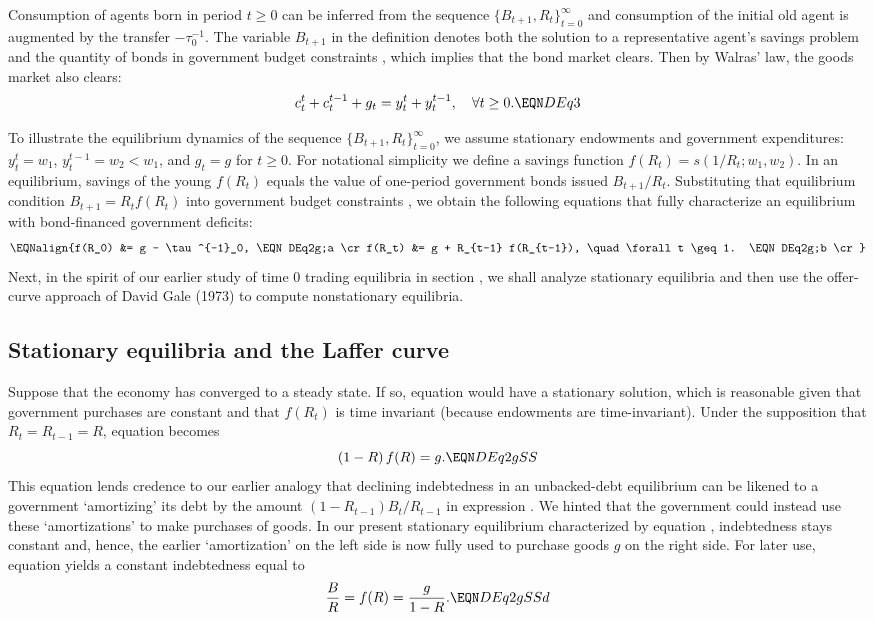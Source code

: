 \noindent
Consumption of agents born in period $t\geq 0$ can be
inferred from the sequence $\{B_{t+1}, R_t\}_{t=0}^\infty$ 
and consumption of the initial old agent is augmented by the
transfer $-\tau^{-1}_0$. The variable $B_{t+1}$ in the definition
denotes both the solution to a representative agent's savings 
problem  and the quantity of bonds in government 
budget constraints , which implies that the 
bond market clears. Then by Walras' law, the goods market also 
clears:
$$c_t^t + c_t^{t-1} + g_t = y_t^t + y_t^{t-1}, 
\quad \forall t \geq 0.        \EQN DEq3
$$


To illustrate the equilibrium dynamics of the sequence
$\{B_{t+1}, R_t\}_{t=0}^\infty$, we assume stationary
endowments and government expenditures: $y^t_t = w_1$,
$y^{t-1}_t=w_2<w_1$, and $g_t=g$ for $t\geq 0$. 
For notational simplicity we define a savings function
$f(R_t)= s(1/R_t; w_1, w_2)$. In an equilibrium, 
savings of the young $f(R_t)$ 
equals the value of one-period government bonds issued
$B_{t+1}/R_t$. Substituting that equilibrium condition
$B_{t+1}=R_t f(R_t)$ into government budget constraints
, we obtain the following equations that
fully characterize an equilibrium with bond-financed 
government deficits:
$$\EQNalign{f(R_0) &= g - \tau^{-1}_0,   \EQN DEq2g;a  \cr
            f(R_t) &= g + R_{t-1} f(R_{t-1}),  \quad \forall t \geq 1. 
                                          \EQN DEq2g;b \cr} $$
Next, in the spirit of our
earlier study of time 0 trading equilibria in 
section , we shall analyze 
stationary equilibria and then use the offer-curve approach 
of David Gale (1973) to compute nonstationary equilibria.



\subsection{Stationary equilibria and the Laffer curve}\label{sec:SSLaffer}
Suppose that the economy has converged to a steady state. 
If so, equation  would have a stationary solution,
which is reasonable given that government 
purchases are constant and that $f(R_t)$ is time
invariant (because endowments are time-invariant).     
Under the supposition that $R_t=R_{t-1}=R$,
equation  becomes
$$ (1-R)\, f(R) = g.        \EQN DEq2gSS $$
This equation lends credence to our earlier analogy that 
declining indebtedness in an unbacked-debt equilibrium 
can be likened to a government `amortizing' its
debt by the amount $(1-R_{t-1})B_t/R_{t-1}$ in 
expression . We hinted that the government 
could instead use these `amortizations' to make 
purchases of goods. In our present stationary 
equilibrium characterized by equation ,
indebtedness stays constant and, hence, the earlier
`amortization' on the left side is now
fully used to purchase goods $g$ on the right side.
For later use, equation  yields a constant 
indebtedness equal to 
$$ {B \over R} = f(R) = {g \over 1-R}.    \EQN DEq2gSSd $$

